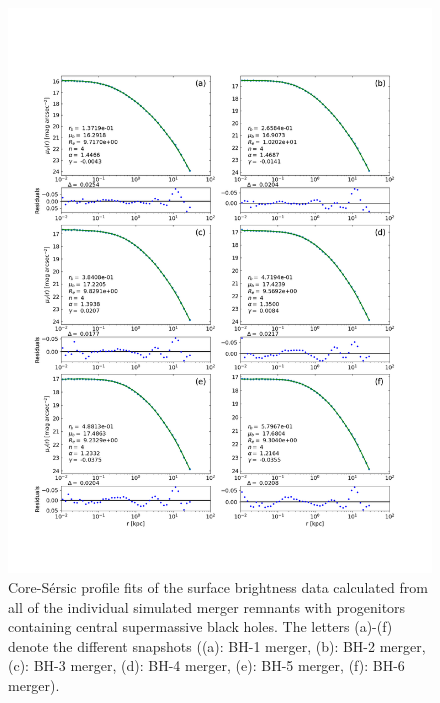 \documentclass[english, oneside]{HYgradu}
\begin{document}
\begin{figure}[h]
	\centering
	\includegraphics[width=\textwidth]{all_core_profiles.png}
	\caption{Core-Sérsic profile fits of the surface brightness data calculated from all of the individual simulated merger remnants with progenitors containing central supermassive black holes. The letters (a)-(f) denote the different snapshots ((a): BH-1 merger, (b): BH-2 merger, (c): BH-3 merger, (d): BH-4 merger, (e): BH-5 merger, (f): BH-6 merger).}
	\label{figure:all_core}
\end{figure}
\end{document}
